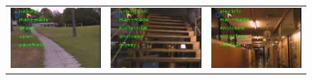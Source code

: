 \documentclass[letterpaper, 10 pt, conference]{ieeeconf}  %
\begin{document}
\newcommand{\scaleVal}{0.27}
\begin{figure}
	\centering
	\begin{tabular}{ccc}
		\includegraphics[scale=\scaleVal]{1-outdoor} &
		\includegraphics[scale=\scaleVal]{2-stairs} &
		\includegraphics[scale=\scaleVal]{3-indoor} \\

\end{tabular}
\end{figure}
\end{document}
